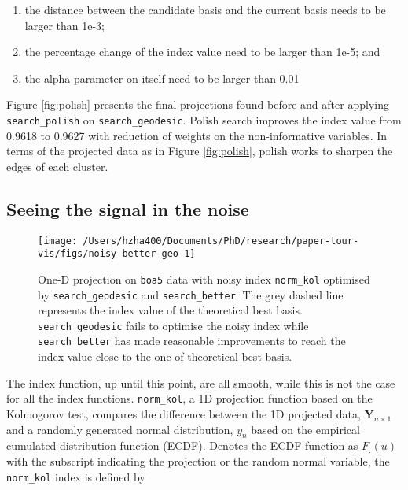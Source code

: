 \documentclass[12pt]{article}
\providecommand{\tightlist}{%
  \setlength{\itemsep}{0pt}\setlength{\parskip}{0pt}}
\begin{document}
\begin{enumerate}
\def\labelenumi{\arabic{enumi})}
\tightlist
\item
  the distance between the candidate basis and the current basis needs to be larger than 1e-3;
\item
  the percentage change of the index value need to be larger than 1e-5; and
\item
  the alpha parameter on itself need to be larger than 0.01
\end{enumerate}

Figure \ref{fig:polish} presents the final projections found before and after applying \texttt{search\_polish} on \texttt{search\_geodesic}. Polish search improves the index value from 0.9618 to 0.9627 with reduction of weights on the non-informative variables. In terms of the projected data as in Figure \ref{fig:polish}, polish works to sharpen the edges of each cluster.

\hypertarget{seeing-the-signal-in-the-noise}{%
\subsection{Seeing the signal in the noise}\label{seeing-the-signal-in-the-noise}}

\begin{figure}

{\centering \texttt{[image: /Users/hzha400/Documents/PhD/research/paper-tour-vis/figs/noisy-better-geo-1]} 

}

\caption{One-D projection on \texttt{boa5} data with noisy index \texttt{norm\_kol} optimised by \texttt{search\_geodesic} and \texttt{search\_better}. The grey dashed line represents the index value of the theoretical best basis. \texttt{search\_geodesic} fails to optimise the noisy index while \texttt{search\_better} has made reasonable improvements to reach the index value close to the one of theoretical best basis.}\label{fig:noisy-better-geo}
\end{figure}



The index function, up until this point, are all smooth, while this is not the case for all the index functions. \texttt{norm\_kol}, a 1D projection function based on the Kolmogorov test, compares the difference between the 1D projected data, \(\mathbf{Y}_{n \times 1}\) and a randomly generated normal distribution, \(y_n\) based on the empirical cumulated distribution function (ECDF). Denotes the ECDF function as \(F_{.}(u)\) with the subscript indicating the projection or the random normal variable, the \texttt{norm\_kol} index is defined by
\end{document}
